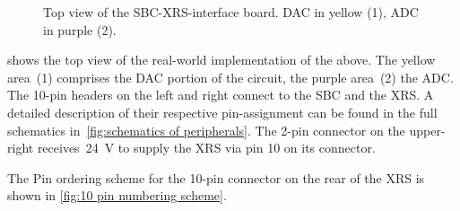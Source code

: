 
            \begin{figure}[h]
                \centering
                
                \caption[Top view of the SBC-XRS-interface board]{Top view of the SBC-XRS-interface board. DAC in yellow (1), ADC in purple (2).}%
                \label{fig:top view interface board}
            \end{figure}\par\medskip

             shows the top view of the real-world implementation of the above.
            The yellow area~(1) comprises the DAC portion of the circuit, the purple area~(2) the ADC.
            The 10-pin headers on the left and right connect to the SBC and the XRS.
            A detailed description of their respective pin-assignment can be found in the full schematics in~\cref{fig:schematics of peripherals}.
            The 2-pin connector on the upper-right receives~\qty{24}{\volt} to supply the XRS via pin 10 on its connector.

            The Pin ordering scheme for the 10-pin connector on the rear of the XRS is shown in \cref{fig:10 pin numbering scheme}.